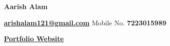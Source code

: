 \documentclass{article}%
\begin{document}
\begin{flushleft}
\textbf{\Large{\huge Aarish Alam}}
\end{flushleft}
{\textbf{\href{mailto:arishalam121@gmail.com}{arishalam121@gmail.com}}}
\hfill{Mobile No. \textbf{7223015989}}

\begin{flushleft}
{\href{https://behavior.systems/}{\textbf{Portfolio Website}}}\hfill
\begin{minipage}{0.4\textwidth}
\raggedleft
\href{https://github.com/RheagalFire}{\faGithub}\hspace{2mm}
\href{https://www.linkedin.com/in/aarish-alam/}{\faLinkedin}\hspace{2mm}
\href{https://arishalam121.medium.com/}{\faMedium}\hspace{2mm}
\href{https://www.kaggle.com/arishalam}{\faKaggle}
\end{minipage}
\end{flushleft}
\end{document}
